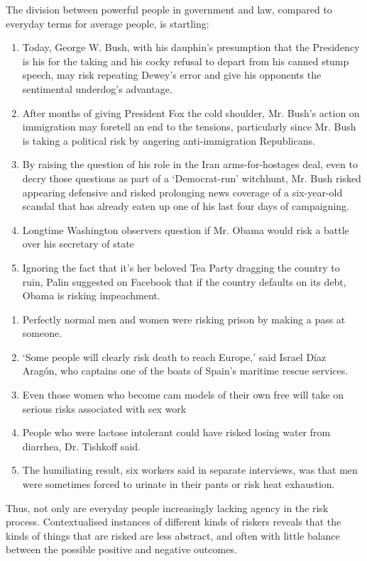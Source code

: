 The division between powerful people in government and law, compared to everyday terms for average people, is startling:

\begin{multicols}{2}
\begin{enumerate} [before=\color{black}\ttfamily] \setlength\itemsep{0em} \small
\item Today, George W. Bush, with his dauphin's presumption that the Presidency is his for the taking and his cocky refusal to depart from his canned stump speech, may risk repeating Dewey's error and give his opponents the sentimental underdog's advantage.
\item After months of giving President Fox the cold shoulder, Mr. Bush's action on immigration may foretell an end to the tensions, particularly since Mr. Bush is taking a political risk by angering anti-immigration Republicans.
\item By raising the question of his role in the Iran arms-for-hostages deal, even to decry those questions as part of a `Democrat-run' witchhunt, Mr. Bush risked appearing defensive and risked prolonging news coverage of a six-year-old scandal that has already eaten up one of his last four days of campaigning.
\item Longtime Washington observers question if Mr. Obama would risk a battle over his secretary of state
\item Ignoring the fact that it's her beloved Tea Party dragging the country to ruin, Palin suggested on Facebook that if the country defaults on its debt, Obama is risking impeachment. 
\end{enumerate}

\begin{enumerate} [before=\color{black}\ttfamily] \setlength\itemsep{0em} \small
\item Perfectly normal men and women were risking prison by making a pass at someone.
\item `Some people will clearly risk death to reach Europe,' said Israel D\'{i}az Arag\'{o}n, who captains one of the boats of Spain's maritime rescue services.
\item Even those women who become cam models of their own free will take on serious risks associated with sex work
\item People who were lactose intolerant could have risked losing water from diarrhea, Dr. Tishkoff said.
\item The humiliating result, six workers said in separate interviews, was that men were sometimes forced to urinate in their pants or risk heat exhaustion.
\end{enumerate}
\end{multicols}
%
Thus, not only are everyday people increasingly lacking agency in the risk process. Contextualised instances of different kinds of riskers reveals that the kinds of things that are risked are less abstract, and often with little balance between the possible positive and negative outcomes.

